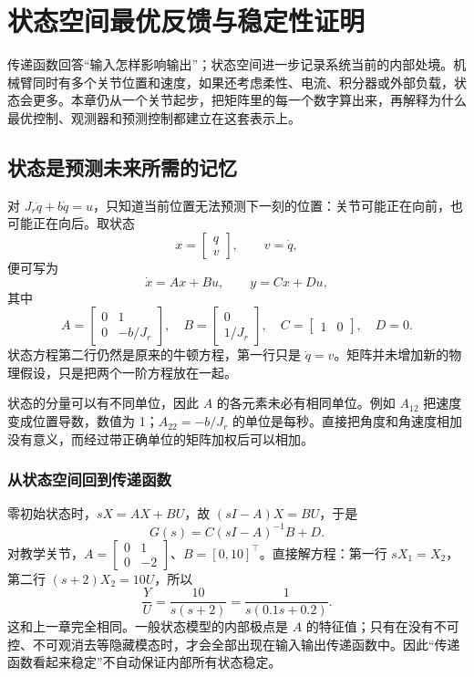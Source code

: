 \chapter{状态空间最优反馈与稳定性证明}
\label{ch:state_space}

传递函数回答“输入怎样影响输出”；状态空间进一步记录系统当前的内部处境。机械臂同时有多个关节位置和速度，如果还考虑柔性、电流、积分器或外部负载，状态会更多。本章仍从一个关节起步，把矩阵里的每一个数字算出来，再解释为什么最优控制、观测器和预测控制都建立在这套表示上。

\section{状态是预测未来所需的记忆}

对 $J_r\ddot q+b\dot q=u$，只知道当前位置无法预测下一刻的位置：关节可能正在向前，也可能正在向后。取状态
\[
x=\begin{bmatrix}q\\v\end{bmatrix},\qquad v=\dot q,
\]
便可写为
\begin{equation}
\dot x=Ax+Bu,\qquad y=Cx+Du,
\end{equation}
其中
\begin{equation}
A=\begin{bmatrix}0&1\\0&-b/J_r\end{bmatrix},\quad
B=\begin{bmatrix}0\\1/J_r\end{bmatrix},\quad
C=\begin{bmatrix}1&0\end{bmatrix},\quad D=0.
\end{equation}
状态方程第二行仍然是原来的牛顿方程，第一行只是 $\dot q=v$。矩阵并未增加新的物理假设，只是把两个一阶方程放在一起。

状态的分量可以有不同单位，因此 $A$ 的各元素未必有相同单位。例如 $A_{12}$ 把速度变成位置导数，数值为 1；$A_{22}=-b/J_r$ 的单位是每秒。直接把角度和角速度相加没有意义，而经过带正确单位的矩阵加权后可以相加。

\subsection{从状态空间回到传递函数}

零初始状态时，$sX=AX+BU$，故 $(sI-A)X=BU$，于是
\[
G(s)=C(sI-A)^{-1}B+D.
\]
对教学关节，$A=\left[\begin{smallmatrix}0&1\\0&-2\end{smallmatrix}\right]$、$B=[0,10]^\top$。直接解方程：第一行 $sX_1=X_2$，第二行 $(s+2)X_2=10U$，所以
\[
\frac{Y}{U}=\frac{10}{s(s+2)}=\frac{1}{s(0.1s+0.2)}.
\]
这和上一章完全相同。一般状态模型的内部极点是 $A$ 的特征值；只有在没有不可控、不可观消去等隐藏模态时，才会全部出现在输入输出传递函数中。因此“传递函数看起来稳定”不自动保证内部所有状态稳定。

